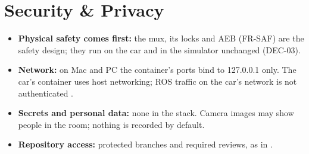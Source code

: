 \documentclass[11pt,a4paper]{article}
\begin{document}
\section{Security \& Privacy}
\begin{itemize}
  \item \textbf{Physical safety comes first:} the mux, its locks and AEB (FR-SAF) are the safety design; they run on the car and in the simulator unchanged (DEC-03).
  \item \textbf{Network:} on Mac and PC the container's ports bind to 127.0.0.1 only. The car's container uses host networking; ROS traffic on the car's network is not authenticated \tbd.
  \item \textbf{Secrets and personal data:} none in the stack. Camera images may show people in the room; nothing is recorded by default.
  \item \textbf{Repository access:} protected branches and required reviews, as in .
\end{itemize}

\end{document}
